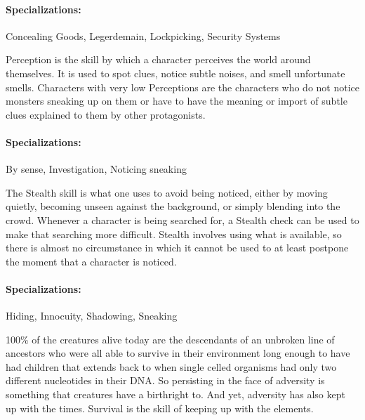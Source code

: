 \paragraph{Specializations:} Concealing Goods, Legerdemain, Lockpicking, Security Systems


\hspace{\parindent} Perception is the skill by which a character perceives the world around themselves. It is used to spot clues, notice subtle noises, and smell unfortunate smells. Characters with very low Perceptions are the characters who do not notice monsters sneaking up on them or have to have the meaning or import of subtle clues explained to them by other protagonists.

\paragraph{Specializations:} By sense, Investigation, Noticing sneaking


\hspace{\parindent} The Stealth skill is what one uses to avoid being noticed, either by moving quietly, becoming unseen against the background, or simply blending into the crowd. Whenever a character is being searched for, a Stealth check can be used to make that searching more difficult. Stealth involves using what is available, so there is almost no circumstance in which it cannot be used to at least postpone the moment that a character is noticed.

\paragraph{Specializations:} Hiding, Innocuity, Shadowing, Sneaking


\hspace{\parindent} 100\% of the creatures alive today are the descendants of an unbroken line of ancestors who were all able to survive in their environment long enough to have had children that extends back to when single celled organisms had only two different nucleotides in their DNA. So persisting in the face of adversity is something that creatures have a birthright to. And yet, adversity has also kept up with the times. Survival is the skill of keeping up with the elements.

